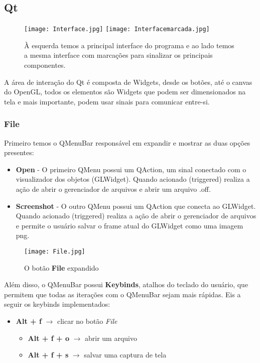 \subsection{Qt}

\begin{figure}[ht]
    \centering
    \texttt{[image: Interface.jpg]}
    \texttt{[image: Interfacemarcada.jpg]}
    \caption{À esquerda temos a principal interface do programa e ao lado temos a mesma interface
    com marcações para sinalizar os principais componentes.}
\end{figure}

A área de interação do Qt é composta de Widgets, desde os botões, até o canvas 
do OpenGL, todos os elementos são Widgets que podem ser dimensionados na tela e 
mais importante, podem usar sinais para comunicar entre-si.

\subsubsection{File}

Primeiro temos o QMenuBar responsável em expandir e mostrar as duas
opções presentes:

\begin{itemize}
    \item \textbf{Open} - O primeiro QMenu possui um QAction, um sinal conectado
    com o visualizador dos objetos (GLWidget). Quando acionado (triggered) realiza
    a ação de abrir o gerenciador de arquivos e abrir um arquivo .off.
    \item \textbf{Screenshot} - O outro QMenu possui um QAction que conecta 
    ao GLWidget. Quando acionado (triggered) realiza a ação de abrir o gerenciador de arquivos
    e permite o usuário salvar o frame atual do GLWidget como uma imagem png.
\end{itemize}

\begin{figure}[H]
    \centering
    \texttt{[image: File.jpg]}
    \caption{O botão \textbf{File} expandido}
\end{figure}

Além disso, o QMenuBar possui \textbf{Keybinds}, atalhos do teclado do usuário, 
que permitem que todas as iterações com o QMenuBar sejam mais rápidas. Eis a seguir 
os keybinds implementados:

\begin{itemize}
    \item \textbf{Alt + f} $\rightarrow$ clicar no botão \emph{File}
    \begin{itemize}
        \item \textbf{Alt + f + o} $\rightarrow$ abrir um arquivo 
        \item \textbf{Alt + f + s} $\rightarrow$ salvar uma captura de tela 
    \end{itemize}
\end{itemize}

